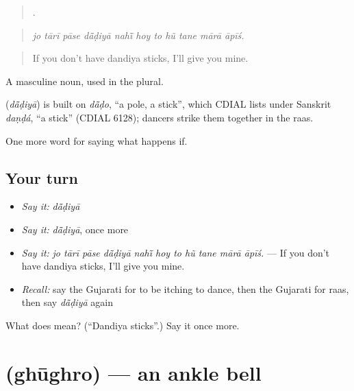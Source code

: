 \begin{quote}
          .
\end{quote}

\begin{quote}
\emph{jo tārī pāse dā̃ḍiyā nahī̃ hoy to hũ tane mārā āpīś.}
\end{quote}

\begin{quote}
If you don't have dandiya sticks, I'll give you mine.
\end{quote}

A masculine noun, used in the plural.

\begin{cousinweb}
\textbf{} (\emph{dā̃ḍiyā}) is built on \emph{dā̃ḍo}, \textquotedblleft{}a pole, a stick\textquotedblright{}, which CDIAL lists under Sanskrit \emph{daṇḍá}, \textquotedblleft{}a stick\textquotedblright{} (CDIAL 6128); dancers strike them together in the raas.
\end{cousinweb}

\begin{grammarlens}[title={What you've built}]
One more word for saying what happens if.
\end{grammarlens}

\subsection*{Your turn}
\begin{itemize}
\raggedright
  \item \emph{Say it:} \emph{dā̃ḍiyā}
  \item \emph{Say it:} \emph{dā̃ḍiyā}, once more
  \item \emph{Say it:} \emph{jo tārī pāse dā̃ḍiyā nahī̃ hoy to hũ tane mārā āpīś.} — If you don't have dandiya sticks, I'll give you mine.
  \item \emph{Recall:} say the Gujarati for to be itching to dance, then the Gujarati for raas, then say \emph{dā̃ḍiyā} again
\end{itemize}

\begin{tcolorbox}[breakable,colback=teal!4,colframe=teal!35!black,title={Before you move on}]
What does  mean? (\textquotedblleft{}Dandiya sticks\textquotedblright{}.) Say it once more.
\end{tcolorbox}
\section[\texorpdfstring{\gu{ઘૂઘરો} (ghūghro)}{ઘૂઘરો (ghūghro)}]{ (ghūghro) — an ankle bell}

